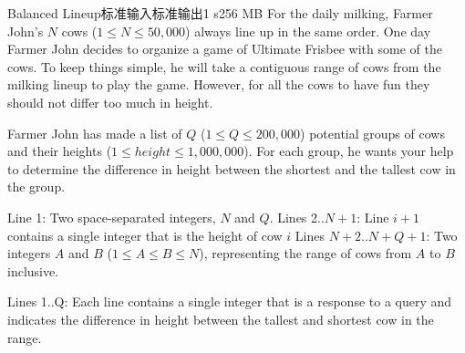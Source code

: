 \begin{problem}{Balanced Lineup}{标准输入}{标准输出}{1 s}{256 MB}
For the daily milking, Farmer John's $N$ cows ($1 \leq N \leq 50,000$) always line up in the same order. One day Farmer John decides to organize a game of Ultimate Frisbee with some of the cows. To keep things simple, he will take a contiguous range of cows from the milking lineup to play the game. However, for all the cows to have fun they should not differ too much in height.

Farmer John has made a list of $Q$ ($1 \leq Q \leq 200,000$) potential groups of cows and their heights ($1 \leq height \leq 1,000,000$). For each group, he wants your help to determine the difference in height between the shortest and the tallest cow in the group.

\InputFile
Line 1: Two space-separated integers, $N$ and $Q$.
Lines 2..$N+1$: Line $i+1$ contains a single integer that is the height of cow $i$
Lines $N+2..N+Q+1$: Two integers $A$ and $B$ ($1 \leq A \leq B \leq N$), representing the range of cows from $A$ to $B$ inclusive.

\OutputFile
Lines 1..Q: Each line contains a single integer that is a response to a query and indicates the difference in height between the tallest and shortest cow in the range.

\Example

\begin{example}
\end{example}

\end{problem}
